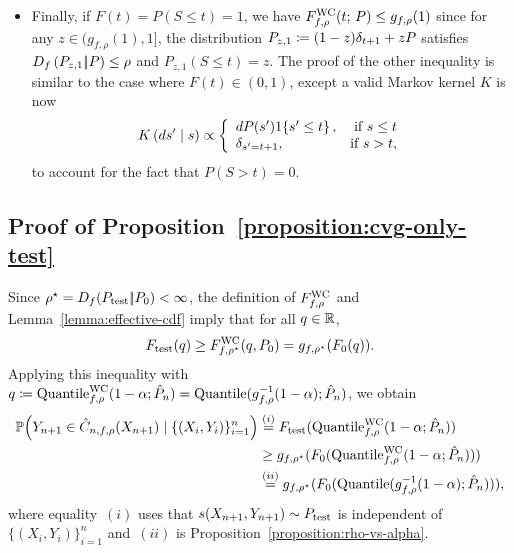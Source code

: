 \begin{itemize}
\item Finally, if $F(t) = P(S \le t) = 1$, we have $F^{\textup{WC}}_{f,\rho}(t; \, P) \le g_{f,\rho}(1)$ since for any $z \in (g_{f,\rho}(1),1]$, the distribution $P_{z,1} \coloneqq (1-z) \delta_{t+1} + z P$ satisfies $D_{f}\left({P_{z,1}} |\!| {P}\right) \le \rho$ and $P_{z,1}(S\le t) = z$.
The proof of the other inequality is similar to the case where $F(t) \in (0,1)$, except a valid Markov kernel $K$ is now
\begin{align*}
  K \left(ds^\prime \mid s \right) \propto              
  \left\{
  \begin{array}{lr}
    dP(s^\prime) 1\!\left\{s^\prime \le t\right\}, &\text{if } s \le t\\
    \delta_{s^\prime = t+1},   &\text{if } s > t,\\
  \end{array}\right.
\end{align*}
to account for the fact that $P(S>t) = 0$.
\end{itemize}




\subsection{Proof of Proposition~\ref{proposition:cvg-only-test}}
\label{sec:proof-cvg-only-test}

Since $\rho^\star = D_{f}({P_\textup{test}} |\!| {P_0}) < \infty$, the definition of
$F^{\textup{WC}}_{f,\rho}$ and Lemma~\ref{lemma:effective-cdf}
imply that for all $q \in \mathbb{R}$,
\begin{align*}
  F_\textup{test}(q) \ge F^{\textup{WC}}_{f,\rho^\star}(q, P_0) = g_{f,\rho^\star}(F_0(q)).
\end{align*}
Applying this inequality with $q \coloneqq \textup{Quantile}^{\textup{WC}}_{f,\rho}(1-\alpha; \hat
P_n) = \textup{Quantile}(g_{f,\rho}^{-1}(1-\alpha); \hat P_n)$, we obtain
\begin{align*}
  \mathbb{P} \Big( Y_{n+1} \in \hat C_{n,f, \rho}(X_{n+1}) \mid \{(X_i,Y_i)\}_{i=1}^n
  \Big) & \stackrel{(i)}{=} F_\textup{test}( \textup{Quantile}^{\textup{WC}}_{f,\rho}(1-\alpha; \hat
  P_n) ) \\ &\ge g_{f,\rho^\star}(F_0(\textup{Quantile}^{\textup{WC}}_{f,\rho}(1-\alpha; \hat
  P_n))) \\ &\stackrel{(ii)}{=}
  g_{f,\rho^\star}(F_0(\textup{Quantile}(g_{f,\rho}^{-1}(1-\alpha); \hat P_n))),
\end{align*}
where equality~$(i)$ uses that $s(X_{n+1},Y_{n+1}) \sim P_{\textup{test}}$ is
independent of $\{(X_i, Y_i) \}_{i=1}^n$
and~$(ii)$ is Proposition~\ref{proposition:rho-vs-alpha}.

